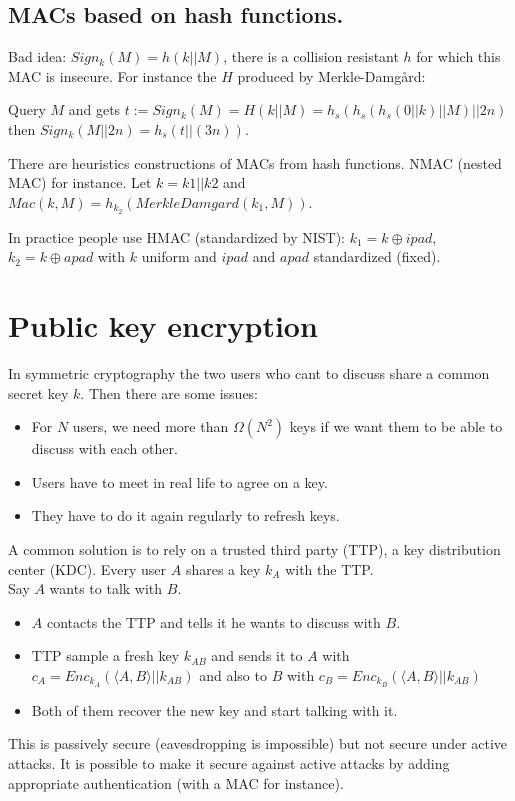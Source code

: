 \documentclass{article}
\newcommand{\brakets}[1]{\langle#1\rangle}
\begin{document}
\subsection{MACs based on hash functions.}
Bad idea: $Sign_k(M)=h(k||M)$, there is a collision resistant $h$ for which this MAC is insecure. For instance the $H$ produced by Merkle-Damg\aa rd:

Query $M$ and gets $t:=Sign_k(M)=H(k||M)=h_s(h_s(h_s(0||k)||M)||2n)$ then $Sign_k(M||2n)=h_s(t||(3n))$. 

There are heuristics constructions of MACs from hash functions. NMAC (nested MAC) for instance. Let $k=k1||k2$ and $Mac(k,M)=h_{k_2}(MerkleDamgard(k_1,M))$.

In practice people use HMAC (standardized by NIST): $k_1=k\oplus ipad$, $k_2=k\oplus apad$ with $k$ uniform and $ipad$ and $apad$ standardized (fixed). 

\section{Public key encryption}
In symmetric cryptography the two users who cant to discuss share a common secret key $k$. Then there are some issues:\begin{itemize}
\item For $N$ users, we need more than $\Omega(N^2)$ keys if we want them to be able to discuss with each other.
\item Users have to meet in real life to agree on a key.
\item They have to do it again regularly to refresh keys.
\end{itemize}
A common solution is to rely on a trusted third party (TTP), a key distribution center (KDC). Every user $A$ shares a key $k_A$ with the TTP. \\
Say $A$ wants to talk with $B$. \begin{itemize}
\item $A$ contacts the TTP and tells it he wants to discuss with $B$.
\item TTP sample a fresh key $k_{AB}$ and sends it to $A$ with $c_A = Enc_{k_A}(\brakets{A,B}||k_{AB})$ and also to $B$ with $c_B = Enc_{k_B}(\brakets{A,B}||k_{AB})$
\item Both of them recover the new key and start talking with it.
\end{itemize} 

This is passively secure (eavesdropping is impossible) but not secure under active attacks. It is possible to make it secure against active attacks by adding appropriate authentication (with a MAC for instance).
\end{document}
